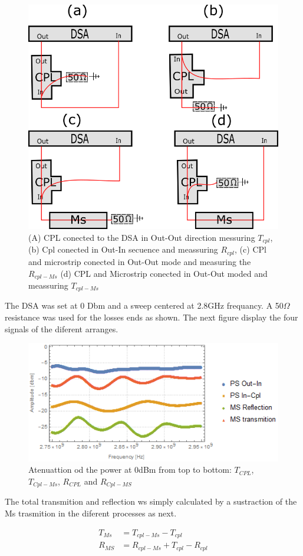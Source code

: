 \begin{figure}[hb]
	\centering
	\includegraphics[width=0.7\linewidth]{../figures/APD}
	\caption[diferent arranges of the CPL and MicroStrip conected to the DSA]{(A) CPL conected to the DSA in Out-Out direction messuring $T_{cpl}$, (b) Cpl conected in Out-In secuence and meassuring $R_{cpl}$, (c) CPl and microstrip conected in Out-Out mode and measuring the $R_{cpl-Ms}$ (d) CPL and Microstrip conected in Out-Out moded and meassuring $T_{cpl-Ms}$}
	\label{fig:apd}
\end{figure}

The DSA was set at 0 Dbm and a sweep centered at 2.8GHz frequancy. A 50$\Omega$ resistance was used for the losses ends as shown. The next figure display the four signals of the diferent arranges.
\begin{figure}
	\centering
	\includegraphics[width=0.7\linewidth]{../figures/microstrip}
	\caption{Atenuattion od the power at 0dBm from top to bottom: $T_{CPL}$,$T_{Cpl-Ms}$, $R_{CPL}$ and $R_{Cpl-MS}$}
	\label{fig:microstrip}
	\end{figure}

The total transmition and reflection ws simply calculated by a sustraction of the Ms trasmition in the diferent processes as next.

\begin{align}
T_{Ms}&=T_{cpl-Ms}-T_{cpl}\\
R_{MS}&=R_{cpl-Ms}+T_{cpl}-R_{cpl}
\end{align}



